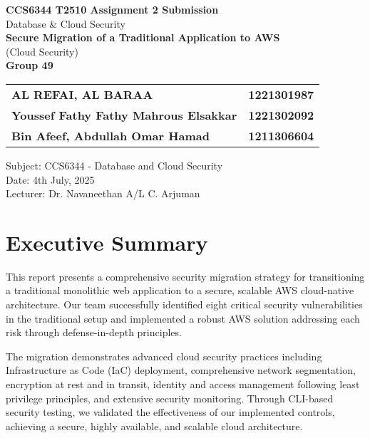 \documentclass[12pt]{article}
\begin{document}
\begin{titlepage}
\centering
\vspace*{2cm}

{\LARGE \textbf{CCS6344 T2510 Assignment 2 Submission}}\\[0.5cm]
{\Large Database \& Cloud Security}\\[1cm]

{\Large \textbf{Secure Migration of a Traditional Application to AWS}}\\[0.5cm]
{\large (Cloud Security)}\\[2cm]

{\large \textbf{Group 49}}\\[1cm]

\begin{tabular}{ll}
\textbf{AL REFAI, AL BARAA} & \textbf{1221301987} \\[0.3cm]
\textbf{Youssef Fathy Fathy Mahrous Elsakkar} & \textbf{1221302092} \\[0.3cm]
\textbf{Bin Afeef, Abdullah Omar Hamad} & \textbf{1211306604} \\[0.3cm]
\end{tabular}

\vfill

{\large Subject: CCS6344 - Database and Cloud Security}\\[0.3cm]
{\large Date: 4th July, 2025}\\[0.3cm]
{\large Lecturer: Dr. Navaneethan A/L C. Arjuman }

\end{titlepage}

\newpage
\tableofcontents
\newpage

\section{Executive Summary}

This report presents a comprehensive security migration strategy for transitioning a traditional monolithic web application to a secure, scalable AWS cloud-native architecture. Our team successfully identified eight critical security vulnerabilities in the traditional setup and implemented a robust AWS solution addressing each risk through defense-in-depth principles.

The migration demonstrates advanced cloud security practices including Infrastructure as Code (IaC) deployment, comprehensive network segmentation, encryption at rest and in transit, identity and access management following least privilege principles, and extensive security monitoring. Through CLI-based security testing, we validated the effectiveness of our implemented controls, achieving a secure, highly available, and scalable cloud architecture.
\end{document}
